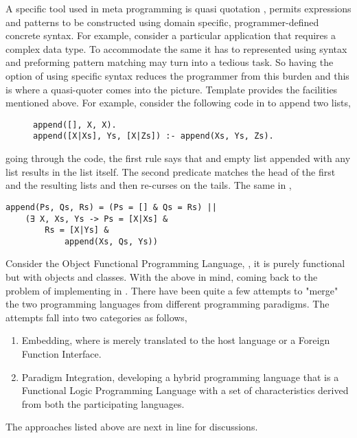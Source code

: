 \documentclass[proposal.tex]{subfiles}
\begin{document}
\par A specific tool used in meta programming is quasi quotation \cite{mainland2007s,haskellquasi,wikiquasi}, permits  expressions 
and patterns to be constructed using domain specific, programmer-defined concrete syntax. For example, consider a particular application that requires a 
complex data type. To accommodate the same it has to represented using  syntax and preforming pattern matching may turn into a 
tedious task. So having the option of using specific syntax reduces the programmer from this burden and this is where a quasi-quoter comes into the 
picture. Template  provides the facilities mentioned above. For example, consider the following code in  to append 
two lists,
\begin{figure}[h]
\begin{verbatim}
append([], X, X).
append([X|Xs], Ys, [X|Zs]) :- append(Xs, Ys, Zs).
\end{verbatim}    
\end{figure}
going through the code, the first rule says that and empty list appended with any list results in the list itself. The second predicate matches the head of the 
first and the resulting lists and then re-curses on the tails. The same in ,

\begin{verbatim}
append(Ps, Qs, Rs) = (Ps = [] & Qs = Rs) ||
	(∃ X, Xs, Ys -> Ps = [X|Xs] & 
		Rs = [X|Ys] & 
			append(Xs, Qs, Ys))
\end{verbatim}  

\par Consider the Object Functional Programming Language,  \cite{website:scala}, it is purely functional but with objects 
and classes. With the above in mind, coming back to the problem of implementing  in . There have been quite a few 
attempts to "merge" the two programming languages from different programming paradigms. The attempts fall into two categories as follows,

\begin{enumerate}
\item Embedding, where  is merely translated to the host language  or a Foreign Function Interface.

\item Paradigm Integration, developing a hybrid programming language that is a Functional Logic Programming Language with a set of characteristics 
derived from both the participating languages.
\end{enumerate}

The approaches listed above are next in line for discussions.  
\end{document}
